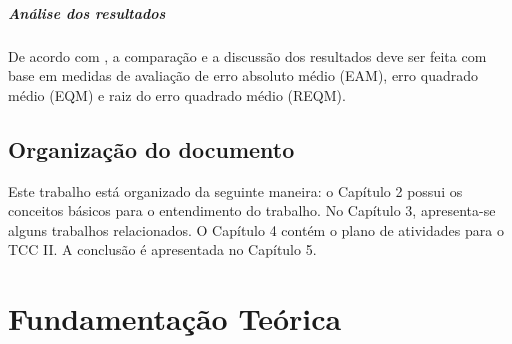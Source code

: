 \documentclass[	12pt, Times, openright, twoside, a4paper, english, brazil]{abntex2}
\begin{document}
        
        \paragraph*{Análise dos resultados}
        De acordo com \cite{Flavia2014}, a comparação e a discussão dos resultados deve ser feita com base em medidas de avaliação de erro absoluto médio (EAM), erro quadrado médio (EQM) e raiz do erro quadrado médio (REQM).

      \section{Organização do documento}
        Este trabalho está organizado da seguinte maneira: o Capítulo 2 possui os conceitos básicos para o entendimento do trabalho. No Capítulo 3, apresenta-se alguns trabalhos relacionados. O Capítulo 4 contém o plano de atividades para o TCC II. A conclusão é apresentada no Capítulo 5.
  \chapter{Fundamentação Teórica}

\end{document}
